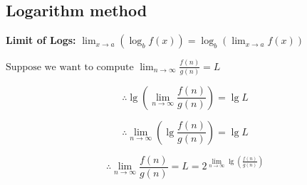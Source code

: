 \subsection{Logarithm method}
    \begin{definition}
        \textbf{Limit of Logs:} $\lim_{x \to a} (\log_b f(x)) = \log_b \left( \lim_{x \to a} f(x) \right)$

        $\text{Suppose we want to compute } \lim_{n \to \infty} \frac{f(n)}{g(n)} = L$

        \[
        \therefore \lg \left( \lim_{n \to \infty} \frac{f(n)}{g(n)} \right) = \lg L
        \]

        \[
        \therefore \lim_{n \to \infty} \left( \lg \frac{f(n)}{g(n)} \right) = \lg L
        \]

        \[
        \therefore \lim_{n \to \infty} \frac{f(n)}{g(n)} = L = 2^{\lim_{n \to \infty} \lg \left( \frac{f(n)}{g(n)} \right)}
        \]
    \end{definition}

